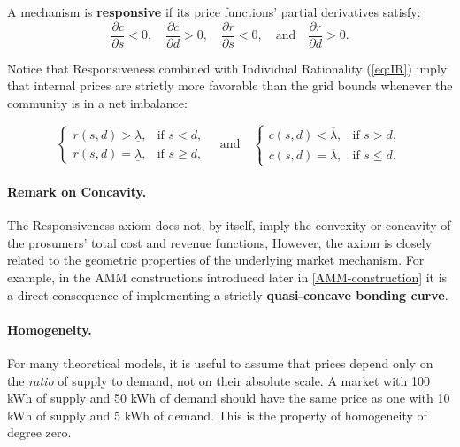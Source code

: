 \documentclass[12pt, notitlepage]{article}
\begin{document}
\begin{axiom}[Responsiveness] \label{ax:resp}
A mechanism is \textbf{responsive} if its price functions' partial derivatives satisfy:
\begin{equation}
\frac{\partial c}{\partial s} < 0, \quad
\frac{\partial c}{\partial d} > 0, \quad
\frac{\partial r}{\partial s} < 0, \quad \text{and} \quad
\frac{\partial r}{\partial d} > 0.
\end{equation}
\end{axiom}

\noindent{}Notice that Responsiveness combined with Individual Rationality (\cref{eq:IR}) imply that internal prices are strictly more favorable than the grid bounds whenever the community is in a net imbalance:

\begin{equation}
\begin{cases}
\label{eq:prices_IR+RESP}
r(s,d) > \underline{\lambda}, & \text{if } s < d, \\
r(s,d) = \underline{\lambda}, & \text{if } s \ge d,
\end{cases}
\quad \text{and} \quad
\begin{cases}
c(s,d) < \overline{\lambda}, & \text{if } s > d, \\
c(s,d) = \overline{\lambda}, & \text{if } s \le d.
\end{cases}
\end{equation}

\paragraph{Remark on Concavity.}
The Responsiveness axiom does not, by itself, imply the convexity or concavity of the prosumers' total cost and revenue functions, However, the axiom is closely related to the geometric properties of the underlying market mechanism. For example, in the AMM constructions introduced later in \cref{AMM-construction} it is a direct consequence of implementing a strictly \textbf{quasi-concave bonding curve}. 

\paragraph{Homogeneity.}
For many theoretical models, it is useful to assume that prices depend only on the \textit{ratio} of supply to demand, not on their absolute scale. A market with 100 kWh of supply and 50 kWh of demand should have the same price as one with 10 kWh of supply and 5 kWh of demand. This is the property of homogeneity of degree zero.
\end{document}

